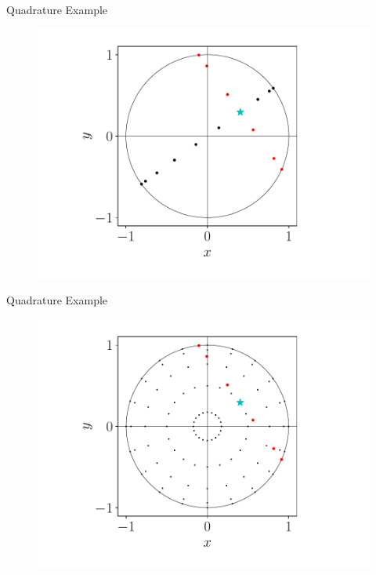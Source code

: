 \documentclass{beamer}
\begin{document}
\begin{frame}{Quadrature Example}
	\begin{figure}[H]
		\centering
		\includegraphics[scale=0.65]{figures/quad_4.pdf}
	\end{figure}
\end{frame}

\begin{frame}{Quadrature Example}
	\begin{figure}[H]
		\centering
		\includegraphics[scale=0.65]{figures/quad_5.pdf}
	\end{figure}
\end{frame}
\end{document}
